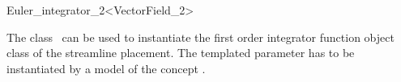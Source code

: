 
\begin{ccRefFunctionObjectClass}{Euler_integrator_2<VectorField_2>}  %

\ccDefinition
  
The class \ccRefName\ can be used to instantiate the first order integrator
function object class of the streamline placement.
The templated parameter  has to
be instantiated by a model of the concept .



\ccIsModel 

 \\


\ccSeeAlso
{} \\
\end{ccRefFunctionObjectClass}


